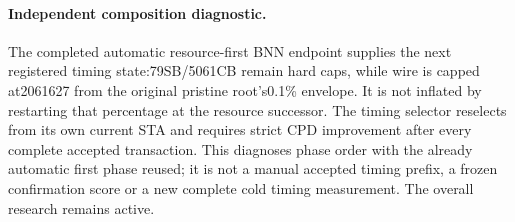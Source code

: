 \paragraph{Independent composition diagnostic.}
The completed automatic resource-first BNN endpoint supplies the next registered timing state:79SB/5061CB remain hard caps, while wire is capped at2061627 from the original pristine root's0.1\% envelope. It is not inflated by restarting that percentage at the resource successor. The timing selector reselects from its own current STA and requires strict CPD improvement after every complete accepted transaction. This diagnoses phase order with the already automatic first phase reused; it is not a manual accepted timing prefix, a frozen confirmation score or a new complete cold timing measurement. The overall research remains active.
